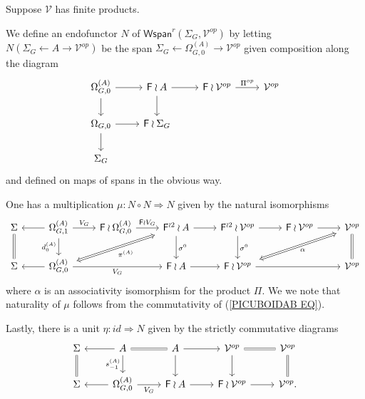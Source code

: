 \documentclass[a4paper,10pt]{article}%
\begin{document}
\begin{definition}
  \label{WSPAN_MONAD_DEFINITION}
	Suppose $\mathcal{V}$ has finite products.
	
	We define an endofunctor $N$ of 
	$\mathsf{Wspan}^r(\Sigma_G,\mathcal{V}^{op})$
	by letting $N(\Sigma_G \leftarrow A \to \mathcal{V}^{op})$
	be the span $\Sigma_G \leftarrow \Omega^{(A)}_{G,0} \to \mathcal{V}^{op}$ given composition along the diagram
\[
	\begin{tikzcd}
	\Omega^{(A)}_{G,0} \ar{r} \ar{d}&
	\Fin \wr A \ar{r} \ar{d}&
	\Fin \wr \mathcal{V}^{op} \ar{r}{\Pi^{op}} &
	\mathcal{V}^{op}
\\
	\Omega_{G,0} \ar{r} \ar{d} &
	\Fin \wr \Sigma_G
\\
	\Sigma_G
	\end{tikzcd}
\]
and defined on maps of spans in the obvious way.

One has a multiplication $\mu \colon N \circ N \Rightarrow N$ given by the natural isomorphisms
\begin{equation}\label{MULTDEFSPAN EQ}
	\begin{tikzcd}
	\Sigma \ar[equal]{d}&
	\Omega_{G,1}^{(A)} \ar{r}{V_G} \ar{d}[swap]{d_{0}^{(A)}} \ar{l}&
	\Fin \wr \Omega_{G,0}^{(A)} \ar{r}{\Fin \wr V_G} &
	|[alias=FFOmega]| \Fin^{\wr 2} \wr A \ar{d}{\sigma^0} \ar{r} &
	\Fin^{\wr 2} \wr \mathcal{V}^{op} \ar{d}{\sigma^0} \ar{r} &
	\Fin \wr \mathcal{V}^{op} \ar{r} &
	|[alias=dog]|
	\mathcal{V}^{op} \ar[equal]{d}
\\
	\Sigma &
	|[alias=Omega]|\Omega_{G,0}^{(A)} \ar{rr}[swap]{V_G} \ar{l}&&
	\Fin \wr A \ar{r} &
	|[alias=cat]|
	\Fin \wr \mathcal{V}^{op} \ar{rr} &&
	\mathcal{V}^{op}
	\arrow[Leftrightarrow, from=FFOmega, to=Omega,shorten <=0.15cm,,shorten >=0.15cm,"\pi^{(A)}"]
	\arrow[Leftrightarrow, from=dog, to=cat,shorten <=0.15cm,,shorten >=0.15cm,"\alpha"]
	\end{tikzcd}
\end{equation}
where $\alpha$ is an associativity isomorphism for the product $\Pi$. We we note that naturality of $\mu$ 
follows from the commutativity of (\ref{PICUBOIDAB EQ}).

Lastly, there is a unit $\eta \colon id \Rightarrow N$ given by the strictly commutative diagrams
\begin{equation}\label{UNITSPAN EQ}
	\begin{tikzcd}
	\Sigma \ar[equal]{d} &
	A \ar{l} \ar{d}[swap]{s_{-1}^{(A)}} \ar[equal]{r} &
	A \ar{d} \ar{r} &
	\mathcal{V}^{op} \ar{d} \ar[equal]{r}&
	\mathcal{V}^{op} \ar[equal]{d}
\\
	\Sigma &
	\Omega_{G,0}^{(A)} \ar{l} \ar{r}[swap]{V_G}&
	\Fin \wr A \ar{r} &
	\Fin \wr \mathcal{V}^{op} \ar{r} &
	\mathcal{V}^{op}.
	\end{tikzcd}
\end{equation}	
\end{definition}
\end{document}
